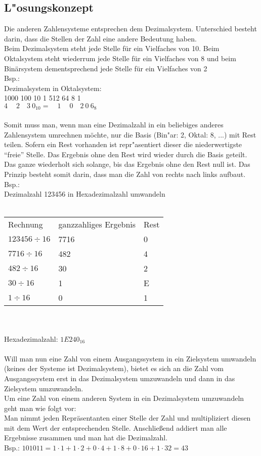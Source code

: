 \documentclass[a4paper,11pt,titlepage]{article}
\begin{document}
\subsection{L"osungskonzept}
Die anderen Zahlensysteme entsprechen dem Dezimalsystem. Unterschied besteht darin, dass die Stellen der Zahl eine andere Bedeutung haben.\\
Beim Dezimalsystem steht jede Stelle für ein Vielfaches von 10. Beim Oktalsystem steht wiederrum jede Stelle für ein Vielfaches von 8 und beim Binärsystem dementsprechend jede Stelle für ein Vielfaches von 2\\
Bsp.:\\
Dezimalsystem in Oktalsystem:\\
\scriptsize 1000 100 10 1\qquad{} 512 64 8 1 \\
\normalsize 
$4 \quad \ 2\quad3\ 0_{10} =\quad 1 \quad \ 0\quad2\ 0\ 6_8$\\
\\
Somit muss man, wenn man eine Dezimalzahl in ein beliebiges anderes Zahlensystem umrechnen möchte, nur die Basis (Bin"ar: 2, Oktal: 8, ...) mit Rest teilen. Sofern ein Rest vorhanden ist repr"asentiert dieser die niederwertigste "`freie"' Stelle. Das Ergebnis ohne den Rest wird wieder durch die Basis geteilt. Das ganze wiederholt sich solange, bis das Ergebnis ohne den Rest null ist. Das Prinzip besteht somit darin, dass man die Zahl von rechts nach links aufbaut.\\
Bsp.:\\
Dezimalzahl 123456 in Hexadezimalzahl umwandeln\\
\\
\begin{tabular}{lll}
Rechnung&ganzzahliges Ergebnis&Rest\\
$123456 \div 16$ &7716&0\\
$7716 \div 16$ &482&4\\
$482 \div 16$ &30&2\\
$30 \div 16$ &1&E\\
$1 \div 16$ &0&1\\
\end{tabular}\\
\\
Hexadezimalzahl: $1E240_{16}$\\
\\
Will man nun eine Zahl von einem Ausgangssystem in ein Zielsystem umwandeln (keines der Systeme ist Dezimalsystem), bietet es sich an die Zahl vom Ausgangssystem erst in das Dezimalsystem umzuwandeln und dann in das Zielsystem umzuwandeln.\\
Um eine Zahl von einem anderen System in ein Dezimalsystem umzuwandeln geht man wie folgt vor:\\
Man nimmt jeden Repräsentanten einer Stelle der Zahl und multipliziert diesen mit dem Wert der entsprechenden Stelle. Anschließend addiert man alle Ergebnisse zusammen und man hat die Dezimalzahl.\\
Bsp.: $101011= 1\cdot 1 + 1\cdot 2 + 0\cdot 4 +1\cdot 8 +0\cdot 16 + 1\cdot 32 = 43$
\end{document}

